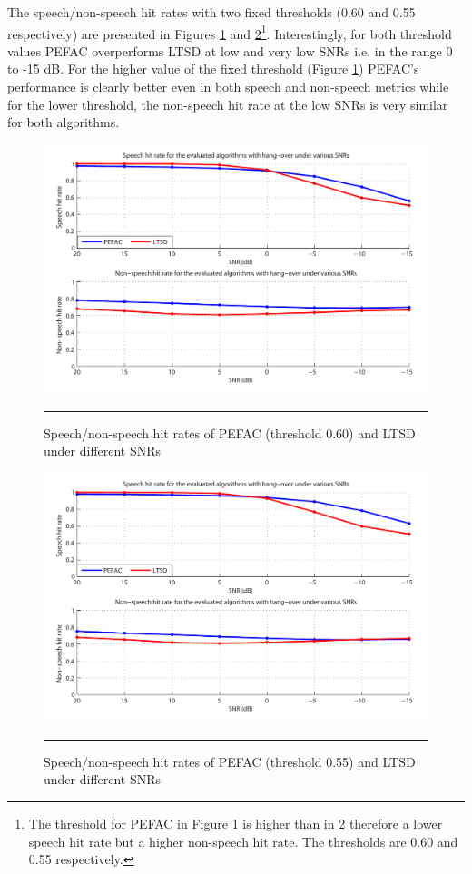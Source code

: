 The speech/non-speech hit rates with two fixed thresholds (0.60 and 0.55 respectively) are presented in Figures \ref{fig:pefacSNR60} and \ref{fig:pefacSNR55}\footnote{The threshold for PEFAC in Figure \ref{fig:pefacSNR60} is higher than in \ref{fig:pefacSNR55} therefore a lower speech hit rate but a higher non-speech hit rate. The thresholds are 0.60 and 0.55 respectively.}. Interestingly, for both threshold values PEFAC overperforms LTSD at low and very low SNRs i.e. in the range 0 to -15 dB. For the higher value of the fixed threshold (Figure \ref{fig:pefacSNR60}) PEFAC's performance is clearly better even in both speech and non-speech metrics while for the lower threshold, the non-speech hit rate at the low SNRs is very similar for both algorithms.

\begin{figure}[htbp]
	\centering
		\includegraphics[width=0.9\columnwidth]{Figures/Chapter5/pefacSNR60bold.pdf}
		\rule{37em}{0.5pt}
	\caption[Speech/non-speech hit rates of PEFAC (threshold 0.60) and LTSD under different SNRs]{Speech/non-speech hit rates of PEFAC (threshold 0.60) and LTSD under different SNRs}
	\label{fig:pefacSNR60}
\end{figure}

\begin{figure}[htbp]
	\centering
		\includegraphics[width=0.9\columnwidth]{Figures/Chapter5/pefacSNR55bold.pdf}
		\rule{37em}{0.5pt}
	\caption[Speech/non-speech hit rates of PEFAC (threshold 0.55) and LTSD under different SNRs]{Speech/non-speech hit rates of PEFAC (threshold 0.55) and LTSD under different SNRs}
	\label{fig:pefacSNR55}
\end{figure}


